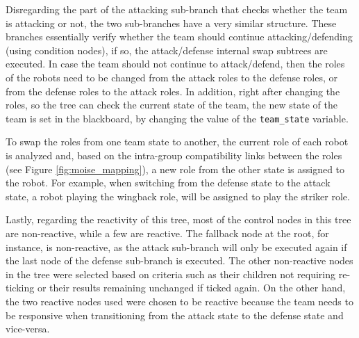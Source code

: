 Disregarding the part of the attacking sub-branch that checks whether the team is attacking or not, the two sub-branches have a very similar structure. These branches essentially verify whether the team should continue attacking/defending (using condition nodes), if so, the attack/defense internal swap subtrees are executed. In case the team should not continue to attack/defend, then the roles of the robots need to be changed from the attack roles to the defense roles, or from the defense roles to the attack roles. In addition, right after changing the roles, so the tree can check the current state of the team, the new state of the team is set in the blackboard, by changing the value of the \texttt{team\_state} variable.

To swap the roles from one team state to another, the current role of each robot is analyzed and, based on the intra-group compatibility links between the roles (see Figure \ref{fig:moise_mapping}), a new role from the other state is assigned to the robot. For example, when switching from the defense state to the attack state, a robot playing the wingback role, will be assigned to play the striker role.

Lastly,  regarding the reactivity of this tree, most of the control nodes in this tree are non-reactive, while a few are reactive. The fallback node at the root, for instance, is non-reactive, as the attack sub-branch will only be executed again if the last node of the defense sub-branch is executed. The other non-reactive nodes in the tree were selected based on criteria such as their children not requiring re-ticking or their results remaining unchanged if ticked again. On the other hand, the two reactive nodes used were chosen to be reactive because the team needs to be responsive when transitioning from the attack state to the defense state and vice-versa.

